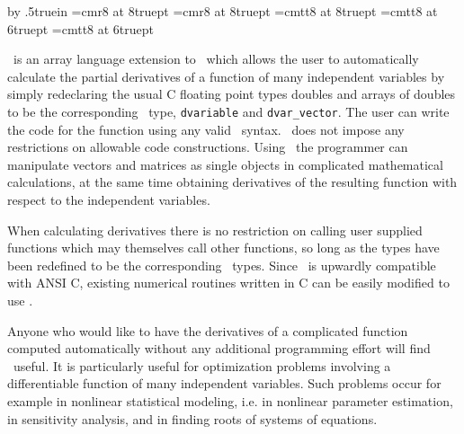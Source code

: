 \documentclass[12pt]{book}
\begin{document}

\def\eqspace{\hskip 1000pt mi 990pt}

\def\endchapter{}
%
\def\eqno{}
\def\thespace{ }
%
\advance\voffset by .5truein
\def\ADM{AD~Model~Builder}
\font\rmmedium=cmr8 at 8truept
\font\rmfoot=cmr8 at 8truept 
\font\ttfoot=cmtt8 at 8truept 
\font\ttsix=cmtt8 at 6truept 
\font\stt=cmtt8 at 6truept 
\def\myeq#1{{\myeqwidth=\hsize \advance\myeqwidth by -.5in
   \hbox to \myeqwidth{\hfil$#1$\hfil}}}

\def\htmlnewfile{}
\def\htmlbeginignore{}
\def\htmlbegintex{}
\def\htmlendtex{}
\def\htmlendignore{}
\thispagestyle{yyy}

\thispagestyle{xxx}
\tableofcontents
\newpage
{}

 
\AD\ is an array language extension to \cplus\ which
allows the user to automatically calculate the partial derivatives
of a function of many independent variables by simply redeclaring the usual C floating point
types doubles and arrays of doubles to be the corresponding
\AD\ type, {\tt dvariable} and {\tt dvar\_vector}. 
The user can
write the code for the function using any valid \cplus\ syntax. 
\AD\ does not impose any restrictions on allowable code constructions. 
Using \AD\ the programmer can manipulate vectors and
matrices as single objects in complicated mathematical calculations,
at the same time obtaining derivatives of the resulting function with
respect to the independent variables.

When calculating derivatives there is no restriction on calling user supplied
functions which may themselves call other functions,
so long as the types have been redefined to be the corresponding \AD\ types.
Since \cplus\ is upwardly compatible with ANSI C,
existing numerical routines written in C can be easily 
modified to use \AD.

Anyone who would like to have the derivatives 
of a complicated function computed automatically
without any additional programming effort will find \AD\ useful.
 It is particularly useful for optimization problems involving
a differentiable function of many independent variables. Such
problems occur for example in nonlinear statistical modeling,
i.e. in nonlinear parameter estimation, in sensitivity analysis,
and in finding roots of systems of equations.
\end{document}
